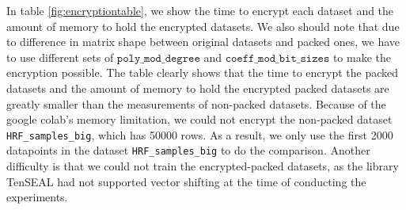    In table \ref{fig:encryptiontable}, we show the time to encrypt each dataset and the amount of memory to hold the encrypted datasets. We also should note that due to difference in matrix shape between original datasets and packed ones, we have to use different sets of $\texttt{poly\_mod\_degree}$ and $\texttt{coeff\_mod\_bit\_sizes}$ to make the encryption possible.  The table clearly shows that the time to encrypt the packed datasets and the amount of memory to hold the encrypted packed datasets are greatly smaller than the measurements of non-packed datasets. Because of the google colab's memory limitation, we could not encrypt the non-packed dataset \texttt{HRF\_samples\_big}, which has 50000 rows. As a result, we only use the first 2000 datapoints in the dataset \texttt{HRF\_samples\_big} to do the comparison. Another difficulty is that we could not train the encrypted-packed datasets, as the library TenSEAL had not supported vector shifting at the time of conducting the experiments.
    
    \begin{table}
    \caption{CKKS encryption time and allocated memory for 4 datasets. NOTE: Some packed datasets require a larger value of $\texttt{poly\_mod\_degree}$, so that we use 2 parameter sets: Set 1: $\texttt{poly\_mod\_degree} = 16384$, $\texttt{coeff\_mod\_bit\_sizes} = [37, 28, 28, 28, 28, 28, 28, 28, 37]$ \& Set 2: $\texttt{poly\_mod\_degree} = 32768$, $\texttt{coeff\_mod\_bit\_sizes} = [37, 28, 28, 28, 28, 28, 28, 28, 37]$.
    }
    \label{fig:encryptiontable}
    \end{table}
    
